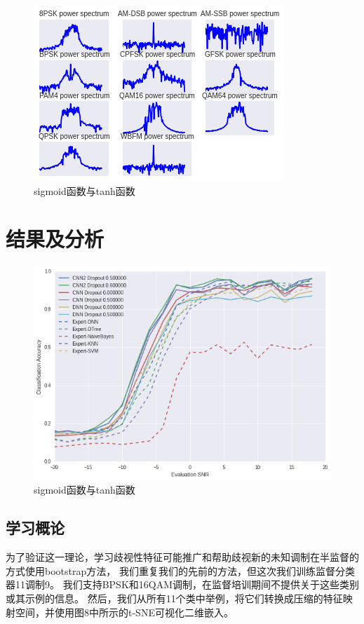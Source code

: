 \begin{figure}[!h]
	\centering
	\includegraphics[scale=0.9]{figures/chapter_3/signal_view_2}
	\caption{sigmoid函数与tanh函数}\label{fig_2_2}
\end{figure}

\section{结果及分析}

\begin{figure}[!h]
	\centering
	\includegraphics[scale=0.3]{figures/chapter_3/result}
	\caption{sigmoid函数与tanh函数}\label{fig_2_2}
\end{figure}

\subsection{学习概论}
为了验证这一理论，学习歧视性特征可能推广和帮助歧视新的未知调制在半监督的方式使用bootstrap方法，
我们重复我们的先前的方法，但这次我们训练监督分类器11调制9。
我们支持BPSK和16QAM调制，在监督培训期间不提供关于这些类别或其示例的信息。
然后，我们从所有11个类中举例，将它们转换成压缩的特征映射空间，并使用图8中所示的t-SNE可视化二维嵌入。\par

